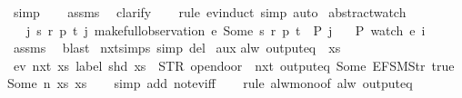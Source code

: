 \begin{isabellebody}
\ simp\isanewline
\ \ \isamarkupfalse%
\ assms\ \isamarkupfalse%
\ clarify\isanewline
\ \ \isamarkupfalse%
\ {\isacharparenleft}rule\ ev{\isachardot}induct{\isacharcomma}\ simp{\isacharcomma}\ auto{\isacharparenright}%
\endisatagproof
{\isafoldproof}%
%
\isadelimproof
\isanewline
%
\endisadelimproof
\isanewline
{}\isamarkupfalse%
\ abstract{\isacharunderscore}watch{\isacharcolon}\isanewline
\ \ \ {\isachardoublequoteopen}{\isasymAnd}j{\isachardot}\ {\isasymexists}s\ r\ p\ t{\isachardot}\ j{\isacharequal}\ make{\isacharunderscore}full{\isacharunderscore}observation\ e\ {\isacharparenleft}Some\ s{\isacharparenright}\ r\ p\ t\ {\isasymLongrightarrow}\ P\ j{\isachardoublequoteclose}\isanewline
\ \ \ {\isachardoublequoteopen}P\ {\isacharparenleft}watch\ e\ i{\isacharparenright}{\isachardoublequoteclose}\isanewline
%
\isadelimproof
\ \ %
\endisadelimproof
%
\isatagproof
{}\isamarkupfalse%
\ assms\ \isamarkupfalse%
\ blast%
\endisatagproof
{\isafoldproof}%
%
\isadelimproof
\isanewline
%
\endisadelimproof
\isanewline
{}\isamarkupfalse%
\ nxt{\isachardot}simps\ {\isacharbrackleft}simp\ del{\isacharbrackright}\isanewline
\isanewline
{}\isamarkupfalse%
\ aux{\isacharcolon}\isanewline
{\isachardoublequoteopen}alw\ {\isacharparenleft}output{\isacharunderscore}eq\ {\isacharbrackleft}{\isacharbrackright}{\isacharparenright}\ xs\ {\isasymLongrightarrow}\isanewline
\ {\isasymnot}ev\ {\isacharparenleft}nxt\ {\isacharparenleft}{\isasymlambda}xs{\isachardot}\ label\ {\isacharparenleft}shd\ xs{\isacharparenright}\ {\isacharequal}\ STR\ {\isacharprime}{\isacharprime}opendoor{\isacharprime}{\isacharprime}\ {\isasymand}\ nxt\ {\isacharparenleft}output{\isacharunderscore}eq\ {\isacharbrackleft}Some\ {\isacharparenleft}EFSM{\isachardot}Str\ {\isacharprime}{\isacharprime}true{\isacharprime}{\isacharprime}{\isacharparenright}{\isacharcomma}\ Some\ n{\isacharbrackright}{\isacharparenright}\ xs{\isacharparenright}{\isacharparenright}\ xs{\isachardoublequoteclose}\isanewline
%
\isadelimproof
\ \ %
\endisadelimproof
%
\isatagproof
{}\isamarkupfalse%
\ {\isacharparenleft}simp\ add{\isacharcolon}\ not{\isacharunderscore}ev{\isacharunderscore}iff{\isacharparenright}\isanewline
\ \ \isamarkupfalse%
\ {\isacharparenleft}rule\ alw{\isacharunderscore}mono{\isacharbrackleft}of\ {\isachardoublequoteopen}alw\ {\isacharparenleft}output{\isacharunderscore}eq\ {\isacharbrackleft}{\isacharbrackright}{\isacharparenright}{\isachardoublequoteclose}{\isacharbrackright}{\isacharparenright}\isanewline

\end{isabellebody}
